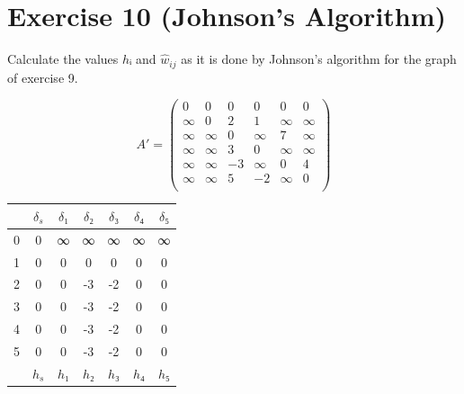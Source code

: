\documentclass[a4paper, 12pt]{article}
\begin{document}
\section{Exercise 10 (Johnson’s Algorithm)}

Calculate the values $hᵢ$ and $\hat{w}_{ij}$ as it is done by Johnson’s
algorithm for the graph of exercise 9.

\begin{minipage}[b]{0.5\linewidth}
\[
A' =
\left(
    \begin{array}{cccccc}
        0   &   0   &   0   &   0   &   0   &  0    \\
        ∞   &   0   &   2   &   1   &   ∞   &  ∞    \\
        ∞   &   ∞   &   0   &   ∞   &   7   &  ∞    \\
        ∞   &   ∞   &   3   &   0   &   ∞   &  ∞    \\
        ∞   &   ∞   &   -3  &   ∞   &   0   &  4    \\
        ∞   &   ∞   &   5   &   -2  &   ∞   &  0    \\
    \end{array}
\right)
\]
\end{minipage}
\begin{minipage}[b]{0.5\linewidth}
\begin{center}
    \begin{tabular}{c|cccccc}
        &  $δ_s$ &  $δ₁$  &  $δ₂$  &  $δ₃$  &  $δ₄$  &  $δ₅$\\
    \hline
    0   &  0     &  ∞      &  ∞      &  ∞      &  ∞      &  ∞    \\
    1   &  0     &  0      &  0      &  0      &  0      &  0    \\
    2   &  0     &  0      &  -3     &  -2     &  0      &  0    \\
    3   &  0     &  0      &  -3     &  -2     &  0      &  0    \\
    4   &  0     &  0      &  -3     &  -2     &  0      &  0    \\
    5   &  0     &  0      &  -3     &  -2     &  0      &  0    \\
    \hline
        &  $h_s$ &  $h₁$  &  $h₂$  &  $h₃$  &  $h₄$  &  $h₅$\\
    \end{tabular}
\end{center}
\end{minipage}
\end{document}

